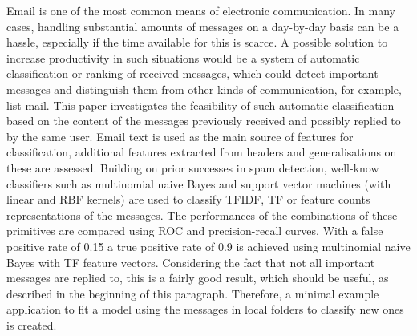 \documentclass[]{trkuur}
\begin{document}
Email is one of the most common means of electronic communication. In many
cases, handling substantial amounts of messages on a day-by-day basis can be a
hassle, especially if the time available for this is scarce. 
A possible solution to increase productivity in such situations would be a
system of automatic classification or ranking of received messages, which could
detect important messages and distinguish them from other kinds of
communication, for example, list mail. 
This paper investigates the feasibility of such automatic classification based
on the content of the messages previously received and possibly replied to by
the same user. Email text is used as the main source of features for
classification, additional features extracted from headers and generalisations
on these are assessed. Building on prior successes in spam detection, well-know
classifiers such as multinomial naive Bayes and support vector machines (with
linear and RBF kernels) are used to classify TFIDF, TF or feature counts
representations of the messages. The performances of the combinations of these
primitives are compared using ROC and precision-recall curves. With a false
positive rate of 0.15 a true positive rate of 0.9 is achieved using multinomial
naive Bayes with TF feature vectors. Considering the fact that not all important
messages are replied to, this is a fairly good result, which should be useful,
as described in the beginning of this paragraph. Therefore, a minimal example
application to fit a model using the messages in local folders to classify new
ones is created.
\end{document}
